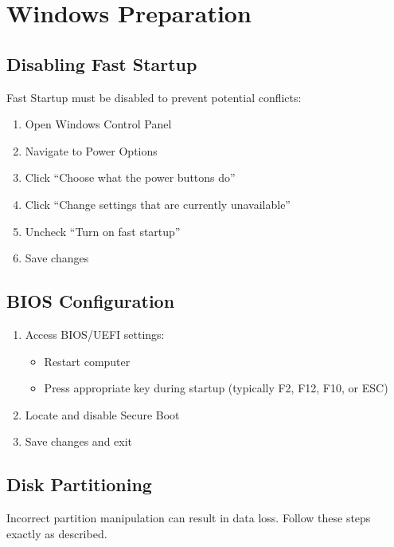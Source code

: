 \documentclass[11pt,a4paper]{article}
\newenvironment{warning}
{\begin{tcolorbox}[colback=warningcolor!10,colframe=warningcolor,title=\textbf{Warning}]}
{\end{tcolorbox}}
\begin{document}
\section{Windows Preparation}
\subsection{Disabling Fast Startup}
Fast Startup must be disabled to prevent potential conflicts:
\begin{enumerate}
    \item Open Windows Control Panel
    \item Navigate to Power Options
    \item Click ``Choose what the power buttons do''
    \item Click ``Change settings that are currently unavailable''
    \item Uncheck ``Turn on fast startup''
    \item Save changes
\end{enumerate}

\subsection{BIOS Configuration}
\begin{enumerate}
    \item Access BIOS/UEFI settings:
    \begin{itemize}
        \item Restart computer
        \item Press appropriate key during startup (typically F2, F12, F10, or ESC)
    \end{itemize}
    \item Locate and disable Secure Boot
    \item Save changes and exit
\end{enumerate}

\subsection{Disk Partitioning}
\begin{warning}
Incorrect partition manipulation can result in data loss. Follow these steps exactly as described.
\end{warning}
\end{document}

